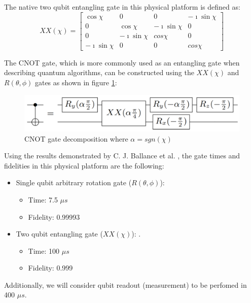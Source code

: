 The native two qubit entangling gate\cite{3QubitGroverSearch_2017} in this physical platform is defined as:
$$XX(\chi)=\left[\begin{array}{cccc}\cos{\chi} & 0 & 0 & -\imath\sin{\chi} \\ 0 & \cos{\chi} & -\imath\sin{\chi} & 0 \\ 0 & -\imath\sin{\chi} & cos{\chi} & 0 \\ -\imath\sin{\chi} & 0 & 0 & cos{\chi}\end{array}\right]$$

The CNOT gate, which is more commonly used as an entangling gate when describing quantum algorithms, can be constructed using the $XX(\chi)$ and $R(\theta,\phi)$ gates as shown in figure \ref{fig:CNOTGate}:

\begin{figure}[h!]
    \centering
    \includegraphics[scale=.35]{images/TrappedIons-CNOTGate.png}
    \caption{CNOT gate \cite{3QubitGroverSearch_2017} decomposition where $\alpha=sgn(\chi)$}
    \label{fig:CNOTGate}
\end{figure}

Using the results demonstrated by C. J. Ballance et al. \cite{TrappedIonHyperfineQubits_2016}, the gate times and fidelities in this physical platform are the following:
\begin{itemize}[noitemsep,nolistsep]
    \item Single qubit arbitrary rotation gate ($R(\theta,\phi)$):
    \begin{itemize}[noitemsep,nolistsep]
        \item Time: 7.5 $\mu s$
        \item Fidelity: 0.99993
    \end{itemize}
    \item Two qubit entangling gate ($XX(\chi)$): .
    \begin{itemize}[noitemsep,nolistsep]
        \item Time: 100 $\mu s$
        \item Fidelity: 0.999
    \end{itemize}
\end{itemize}

Additionally, we will consider qubit readout (measurement) to be perfomed in 400 $\mu s$\cite{TrappedIonQuantumComputing_2019}.

